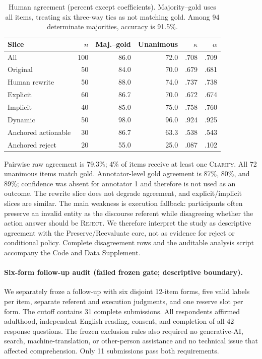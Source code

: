 \documentclass[10pt]{article}
\begin{document}
\begin{table}[H]
\centering
\small
\begin{tabular}{lrrrrr}
\toprule
Slice & $n$ & Maj.--gold & Unanimous & $\kappa$ & $\alpha$\\
\midrule
All & 100 & 86.0 & 72.0 & .708 & .709\\
Original & 50 & 84.0 & 70.0 & .679 & .681\\
Human rewrite & 50 & 88.0 & 74.0 & .737 & .738\\
Explicit & 60 & 86.7 & 70.0 & .672 & .674\\
Implicit & 40 & 85.0 & 75.0 & .758 & .760\\
Dynamic & 50 & 98.0 & 96.0 & .924 & .925\\
Anchored actionable & 30 & 86.7 & 63.3 & .538 & .543\\
Anchored reject & 20 & 55.0 & 25.0 & .087 & .102\\
\bottomrule
\end{tabular}
\caption{Human agreement (percent except coefficients). Majority--gold uses all items, treating
six three-way ties as not matching gold. Among 94 determinate majorities, accuracy is 91.5\%.}
\end{table}

Pairwise raw agreement is 79.3\%; 4\% of items receive at least one \textsc{Clarify}. All 72
unanimous items match gold. Annotator-level gold agreement is 87\%, 80\%, and 89\%; confidence
was absent for annotator 1 and therefore is not used as an outcome. The rewrite slice does not
degrade agreement, and explicit/implicit slices are similar. The main weakness is execution
fallback: participants often preserve an invalid entity as the discourse referent while
disagreeing whether the action answer should be \textsc{Reject}. We therefore interpret the
study as descriptive agreement with the Preserve/Reevaluate core, not as evidence for reject or
conditional policy. Complete disagreement rows and the auditable analysis script accompany the Code and Data Supplement.

\paragraph{Six-form follow-up audit (failed frozen gate; descriptive boundary).}
We separately froze a follow-up with six disjoint 12-item forms, five valid labels per item,
separate referent and execution judgments, and one reserve slot per form. The cutoff contains 31
complete submissions. All respondents affirmed adulthood, independent English reading, consent,
and completion of all 42 response questions. The frozen exclusion rules also required no
generative-AI, search, machine-translation, or other-person assistance and no technical issue that
affected comprehension. Only 11 submissions pass both requirements.
\end{document}
